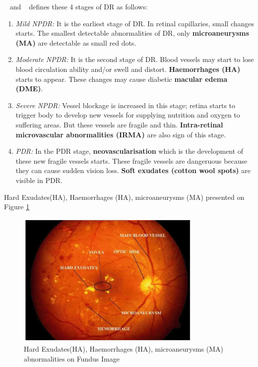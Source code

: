 ~\cite{NationalEyeInstitute} and ~\cite{wilkinson2003proposed} defines these 4 stages of DR as follows:
\begin{enumerate}
        \item \textit{Mild NPDR:} It is the earliest stage of DR. In retinal capillaries, small changes starts. The smallest detectable abnormalities of DR, only \textbf{microaneurysms (MA)} are detectable as small red dots.
        \item \textit{Moderate NPDR:} It is the second stage of DR. Blood vessels may start to lose blood circulation ability and/or swell and distort. \textbf{Haemorrhages (HA)} starts to appear. These changes may cause diabetic \textbf{macular edema (DME)}.  
        \item \textit{Severe NPDR:} Vessel blockage is increased in this stage; retina starts to trigger body to develop new vessels for supplying nutrition and oxygen to suffering areas. But these vessels are fragile and thin. \textbf{Intra-retinal microvascular abnormalities (IRMA)} are also sign of this stage. 
        \item \textit{PDR:} In the PDR stage, \textbf{neovascularisation} which is the development of these new fragile vessels starts. These fragile vessels  are dangeruous because they can cause sudden vision loss. \textbf{Soft exudates (cotton wool spots)} are visible in PDR. 
\end{enumerate}


Hard Exudates(HA), Haemorrhages (HA), microaneurysms (MA) presented on Figure \ref{AbnormalitiesFundusImage}

\begin{figure}[t]
\caption{Hard Exudates(HA), Haemorrhages (HA), microaneurysms (MA) abnormalities on Fundus Image ~\cite{kekre2013hybrid}}
\label{AbnormalitiesFundusImage}
\centering
\includegraphics[width=0.8\textwidth]{Figures/retina_abnormalities}
\end{figure}

